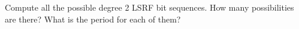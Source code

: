   Compute all the possible degree 2 LSRF bit sequences.
  How many possibilities are there?
  What is the period for each of them?
